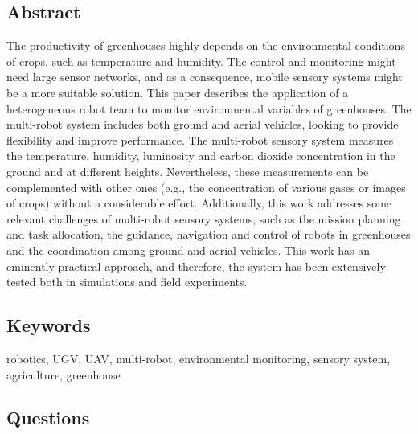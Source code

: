 \subsection*{Abstract}
The productivity of greenhouses highly depends on the environmental conditions of crops,
such as temperature and humidity. The control and monitoring might need large sensor networks,
and as a consequence, mobile sensory systems might be a more suitable solution. This paper describes
the application of a heterogeneous robot team to monitor environmental variables of greenhouses.
The multi-robot system includes both ground and aerial vehicles, looking to provide flexibility
and improve performance. The multi-robot sensory system measures the temperature, humidity,
luminosity and carbon dioxide concentration in the ground and at different heights. Nevertheless,
these measurements can be complemented with other ones (e.g., the concentration of various
gases or images of crops) without a considerable effort. Additionally, this work addresses some
relevant challenges of multi-robot sensory systems, such as the mission planning and task allocation,
the guidance, navigation and control of robots in greenhouses and the coordination among ground
and aerial vehicles. This work has an eminently practical approach, and therefore, the system has
been extensively tested both in simulations and field experiments.


\subsection*{Keywords}
robotics, UGV, UAV, multi-robot, environmental monitoring, sensory system, agriculture, greenhouse


\subsection*{Questions}
